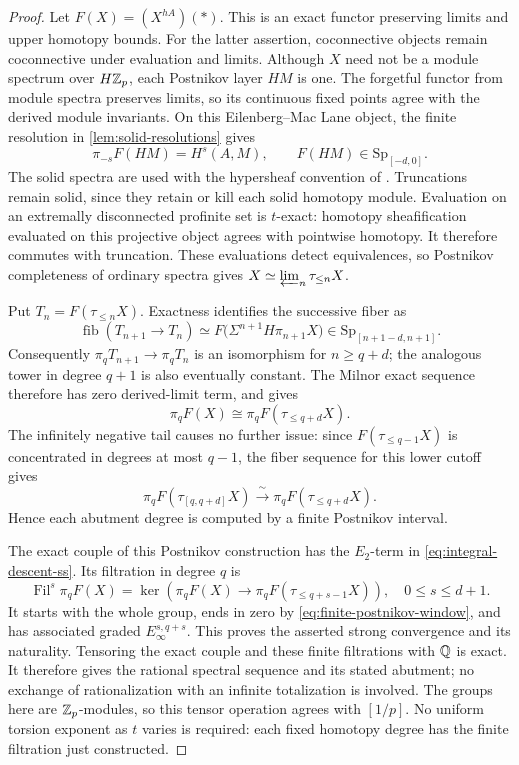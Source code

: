 \begin{proof}
Let $F(X)=(X^{hA})(*)$.  This is an exact functor preserving limits and
upper homotopy bounds.  For the latter assertion, coconnective objects
remain coconnective under evaluation and limits.  Although $X$ need not
be a module spectrum over $H\mathbb Z_p$, each Postnikov layer $HM$ is one.
The forgetful functor from module spectra preserves limits, so its
continuous fixed points agree with the derived module invariants.
On this Eilenberg--Mac Lane object, the finite
resolution in \cref{lem:solid-resolutions} gives
\[
 \pi_{-s}F(HM)=H^s(A,M),\qquad
 F(HM)\in\mathrm{Sp}_{[-d,0]}.
\]
The solid spectra are used with the hypersheaf convention of
\cite[Section~4.5, especially Proposition~4.5.5]{BMR2026}.
Truncations remain solid, since they retain or kill each solid homotopy
module.  Evaluation on an extremally disconnected profinite set is
$t$-exact: homotopy sheafification evaluated on this projective object
agrees with pointwise homotopy.  It therefore commutes with truncation.
These evaluations detect equivalences, so Postnikov completeness of
ordinary spectra gives
$X\simeq\varprojlim_n\tau_{\leq n}X$.

Put $T_n=F(\tau_{\leq n}X)$.  Exactness identifies the successive fiber as
\[
 \operatorname{fib}(T_{n+1}\longrightarrow T_n)
   \simeq F\bigl(\Sigma^{n+1}H\pi_{n+1}X\bigr)
   \in\mathrm{Sp}_{[n+1-d,n+1]}.
\]
Consequently $\pi_qT_{n+1}\to\pi_qT_n$ is an isomorphism for
$n\geq q+d$; the analogous tower in degree $q+1$ is also eventually
constant.  The Milnor exact sequence therefore has zero derived-limit
term, and gives
\begin{equation}\label{eq:finite-postnikov-window}
 \pi_qF(X)\cong\pi_qF(\tau_{\leq q+d}X).
\end{equation}
The infinitely negative tail causes no further issue: since
$F(\tau_{\leq q-1}X)$ is concentrated in degrees at most $q-1$, the
fiber sequence for this lower cutoff gives
\[
 \pi_qF(\tau_{[q,q+d]}X)
     \xrightarrow{\ \sim\ }\pi_qF(\tau_{\leq q+d}X).
\]
Hence each abutment degree is computed by a finite Postnikov interval.

The exact couple of this Postnikov construction has the $E_2$-term in
\eqref{eq:integral-descent-ss}.  Its filtration in degree $q$ is
\[
 \operatorname{Fil}^{s}\pi_qF(X)
 =\ker\!\left(\pi_qF(X)\longrightarrow
              \pi_qF(\tau_{\leq q+s-1}X)\right),
 \quad 0\leq s\leq d+1.
\]
It starts with the whole group, ends in zero by
\eqref{eq:finite-postnikov-window}, and has associated graded
$E_\infty^{s,q+s}$.  This proves the asserted strong convergence and its
naturality.  Tensoring the exact couple and these finite filtrations with
$\mathbb Q$ is exact.  It therefore gives the rational spectral sequence and
its stated abutment; no exchange of rationalization with an infinite
totalization is involved.  The groups here are $\mathbb Z_p$-modules, so this
tensor operation agrees with $[1/p]$.
No uniform torsion exponent as $t$ varies is required: each fixed
homotopy degree has the finite filtration just constructed.
\end{proof}

